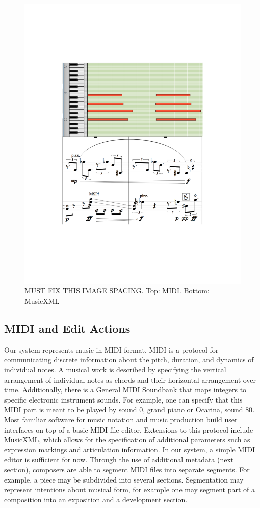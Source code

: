 \documentclass[final,authoryear,5p,times,twocolumn]{elsarticle}
\begin{document}
\begin{figure}
\vspace*{-3cm}
	\includegraphics[scale=0.4]{midi.pdf}
	\caption{MUST FIX THIS IMAGE SPACING. Top: MIDI. Bottom: MusicXML}
	\label{fig:midi}
\end{figure}

\subsection{MIDI and Edit Actions}

Our system represents music in MIDI format. MIDI is a protocol for communicating discrete information about the pitch, duration, and dynamics of individual notes. A musical work is described by specifying the vertical arrangement of individual notes as chords and their horizontal arrangement over time. Additionally, there is a General MIDI Soundbank that maps integers to specific electronic instrument sounds. For example, one can specify that this MIDI part is meant to be played by sound $0$, grand piano or Ocarina, sound $80$. Most familiar software for music notation and music production build user interfaces on top of a basic MIDI file editor. Extensions to this protocol include MusicXML, which allows for the specification of additional parameters such as expression markings and articulation information. In our system, a simple MIDI editor is sufficient for now. Through the use of additional metadata (next section), composers are able to segment MIDI files into separate segments. For example, a piece may be subdivided into several sections. Segmentation may represent intentions about musical form, for example one may segment part of a composition into an exposition and a development section. 
\end{document}

